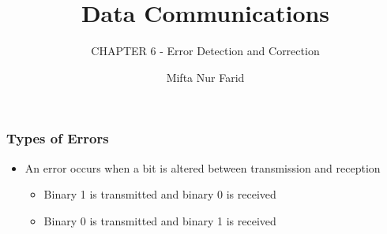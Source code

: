 \documentclass[pdflatex,compress]{beamer}
\title{Data Communications}
\subtitle{CHAPTER 6 - Error Detection and Correction}
\author{Mifta Nur Farid}
\begin{document}
\maketitle

\begin{frame}
	\frametitle{Types of Errors}
	\begin{itemize}
		\item An error occurs when a bit is altered between transmission and reception
		\begin{itemize}
			\item Binary 1 is transmitted and binary 0 is received
			\item Binary 0 is transmitted and binary 1 is received
		\end{itemize}
	\end{itemize}
\end{frame}
\end{document}
